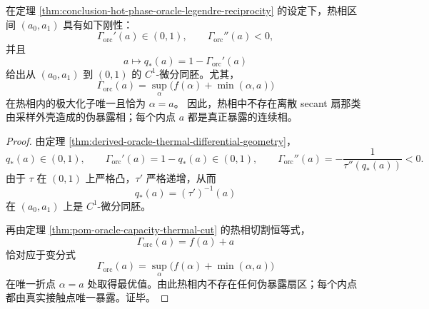 \begin{theorem}[热相无幽灵扇区]\label{thm:conclusion-hot-phase-no-ghost-sector}
在定理 \ref{thm:conclusion-hot-phase-oracle-legendre-reciprocity} 的设定下，热相区间 \((a_0,a_1)\) 具有如下刚性：
\[
\Gamma_{\mathrm{orc}}'(a)\in(0,1),
\qquad
\Gamma_{\mathrm{orc}}''(a)<0,
\]
并且
\[
a\longmapsto q_\ast(a)=1-\Gamma_{\mathrm{orc}}'(a)
\]
给出从 \((a_0,a_1)\) 到 \((0,1)\) 的 \(C^1\)-微分同胚。尤其，
\[
\Gamma_{\mathrm{orc}}(a)
=
\sup_{\alpha}\bigl(f(\alpha)+\min(\alpha,a)\bigr)
\]
在热相内的极大化子唯一且恰为 \(\alpha=a\)。
因此，热相中不存在离散 secant 扇那类由采样外壳造成的伪暴露相；每个内点 \(a\) 都是真正暴露的连续相。
\end{theorem}
\begin{proof}
由定理 \ref{thm:derived-oracle-thermal-differential-geometry}，
\[
q_\ast(a)\in(0,1),
\qquad
\Gamma_{\mathrm{orc}}'(a)=1-q_\ast(a)\in(0,1),
\qquad
\Gamma_{\mathrm{orc}}''(a)=-\frac{1}{\tau''(q_\ast(a))}<0.
\]
由于 \(\tau\) 在 \((0,1)\) 上严格凸，\(\tau'\) 严格递增，从而
\[
q_\ast(a)=(\tau')^{-1}(a)
\]
在 \((a_0,a_1)\) 上是 \(C^1\)-微分同胚。

再由定理 \ref{thm:pom-oracle-capacity-thermal-cut} 的热相切割恒等式，
\[
\Gamma_{\mathrm{orc}}(a)=f(a)+a
\]
恰对应于变分式
\[
\Gamma_{\mathrm{orc}}(a)=\sup_\alpha\bigl(f(\alpha)+\min(\alpha,a)\bigr)
\]
在唯一折点 \(\alpha=a\) 处取得最优值。由此热相内不存在任何伪暴露扇区；每个内点都由真实接触点唯一暴露。证毕。
\end{proof}

